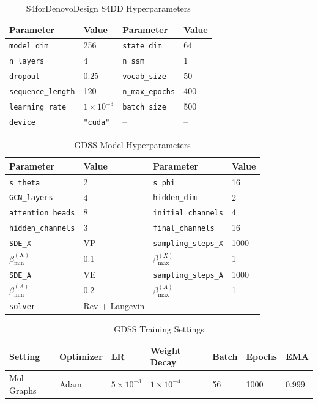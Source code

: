 \begin{table}[H]
\centering
\small
\caption{S4forDenovoDesign S4DD Hyperparameters}
\begin{tabular}{ll|ll}
\toprule
Parameter & Value & Parameter & Value \\
\midrule
\texttt{model\_dim} & 256 & \texttt{state\_dim} & 64 \\
\texttt{n\_layers} & 4 & \texttt{n\_ssm} & 1 \\
\texttt{dropout} & 0.25 & \texttt{vocab\_size} & 50 \\
\texttt{sequence\_length} & 120 & \texttt{n\_max\_epochs} & 400 \\
\texttt{learning\_rate} & $1 \times 10^{-3}$ & \texttt{batch\_size} & 500 \\
\texttt{device} & \texttt{"cuda"} & -- & -- \\
\bottomrule
\end{tabular}
\end{table}
\FloatBarrier

\begin{table}[H]
\centering
\small
\caption{GDSS Model Hyperparameters}
\begin{tabular}{ll|ll}
\toprule
Parameter & Value & Parameter & Value \\
\midrule
\texttt{s\_theta} & 2 & \texttt{s\_phi} & 16 \\
\texttt{GCN\_layers} & 4 & \texttt{hidden\_dim} & 2 \\
\texttt{attention\_heads} & 8 & \texttt{initial\_channels} & 4 \\
\texttt{hidden\_channels} & 3 & \texttt{final\_channels} & 16 \\
\texttt{SDE\_X} & VP & \texttt{sampling\_steps\_X} & 1000 \\
$\beta_{\min}^{(X)}$ & 0.1 & $\beta_{\max}^{(X)}$ & 1 \\
\texttt{SDE\_A} & VE & \texttt{sampling\_steps\_A} & 1000 \\
$\beta_{\min}^{(A)}$ & 0.2 & $\beta_{\max}^{(A)}$ & 1 \\
\texttt{solver} & Rev + Langevin & -- & -- \\
\bottomrule
\end{tabular}
\end{table}
\FloatBarrier

\begin{table}[H]
\centering
\small
\caption{GDSS Training Settings}
\begin{tabular}{lllllll}
\toprule
Setting & Optimizer & LR & Weight Decay & Batch & Epochs & EMA \\
\midrule
Mol Graphs & Adam & $5 \times 10^{-3}$ & $1 \times 10^{-4}$ & 56 & 1000 & 0.999 \\
\bottomrule
\end{tabular}
\end{table}
\FloatBarrier

